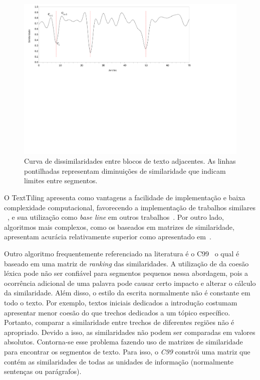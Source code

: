    
\begin{figure}[h!]
\center
	\includegraphics[trim={ 10 320 180 0 },clip,page=1,width=\textwidth]{conteudo/capitulos/figs/curva-similaridade.pdf}

	\caption{Curva de dissimilaridades entre blocos de texto adjacentes. As linhas pontilhadas representam diminuições de similaridade que indicam limites entre segmentos.}
	\label{fig:curvasimilaridade}
\end{figure}



O TextTiling apresenta como vantagens a facilidade de implementação e baixa complexidade computacional, favorecendo a implementação de trabalhos similares 
~\cite{Naili2016,Bokaei2015,CHAIBI2014,Kern2009,Galley2003}, 
e sua utilização como \textit{base line} em outros trabalhos~\cite{Cardoso2017,Dias2007}. Por outro lado, algoritmos mais complexos, como os baseados em matrizes de similaridade, apresentam acurácia relativamente superior como apresentado em~\cite{Choi2000, Kern2009, Misra2009}.



Outro algoritmo frequentemente referenciado na literatura é o C99~\cite{Choi2000} o qual é baseado em uma matriz de \textit{ranking} das similaridades. A utilização de da coesão léxica pode não ser confiável para segmentos pequenos nessa abordagem, pois a ocorrência adicional de uma palavra pode causar certo impacto e alterar o cálculo da similaridade. Além disso, o estilo da escrita normalmente não é constante em todo o texto. Por exemplo, textos iniciais dedicados a introdução costumam apresentar menor coesão do que trechos dedicados a um tópico específico. Portanto, comparar a similaridade entre trechos de diferentes regiões não é apropriado. Devido a isso, as similaridades não podem ser comparadas em valores absolutos. Contorna-se esse problema fazendo uso de matrizes de similaridade para encontrar os segmentos de texto. Para isso, o \textit{C99} constrói uma matriz que contém as similaridades de todas as unidades de informação (normalmente sentenças ou parágrafos). 

